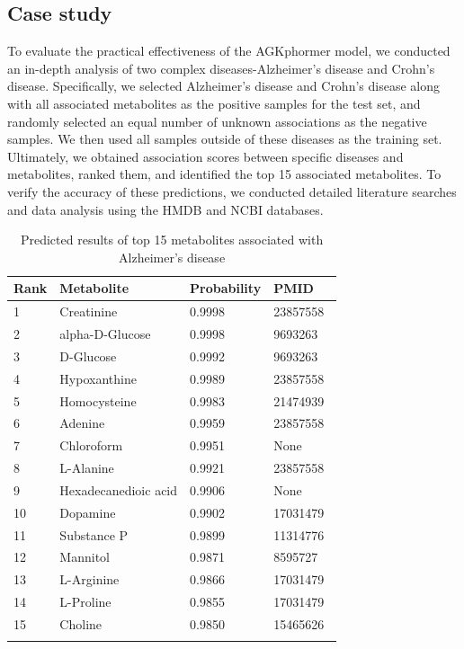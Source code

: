 \documentclass[a4paper,fleqn]{cas-dc}
\begin{document}
\subsection{Case study}
To evaluate the practical effectiveness of the AGKphormer model, we conducted an in-depth analysis of two complex diseases-Alzheimer's disease and Crohn's disease. Specifically, we selected Alzheimer's disease and Crohn's disease along with all associated metabolites as the positive samples for the test set, and randomly selected an equal number of unknown associations as the negative samples. We then used all samples outside of these diseases as the training set. Ultimately, we obtained association scores between specific diseases and metabolites, ranked them, and identified the top 15 associated metabolites. To verify the accuracy of these predictions, we conducted detailed literature searches and data analysis using the HMDB and NCBI databases.


\begin{table}[h]
	\centering
	\vspace{-3mm} %
	\caption{Predicted results of top 15 metabolites associated with Alzheimer's disease}
	\begin{tabular}{llll}
		\toprule
		Rank & Metabolite & Probability & PMID \\ 
		\midrule
		
		1 &	Creatinine &	0.9998  &	23857558 \\
		2 &	alpha-D-Glucose &	0.9998 & 	9693263\\
		3 &	D-Glucose &	0.9992 & 	9693263 \\
		4 &	Hypoxanthine &	0.9989 & 	23857558 \\
		5 &	Homocysteine &	0.9983  &	21474939\\
		6 &	Adenine &	0.9959  &	23857558\\
		7 &	Chloroform &	0.9951 & 	None \\
		8 &	L-Alanine &	0.9921 &	23857558 \\
		9 &	Hexadecanedioic acid &	0.9906 & 	None\\
		10 &	Dopamine &	0.9902 &	17031479 \\
		11 &	Substance P &	0.9899 &	11314776\\
		12 &	Mannitol &	0.9871 &	8595727 \\
		13 &	L-Arginine &	0.9866 &	17031479 \\
		14 &	L-Proline &	0.9855 &	17031479 \\
		15 &	Choline &	0.9850 &	15465626\\
		
		\bottomrule
		\vspace{-5mm} %
		\label{table3}
	\end{tabular}
\end{table}
\end{document}
